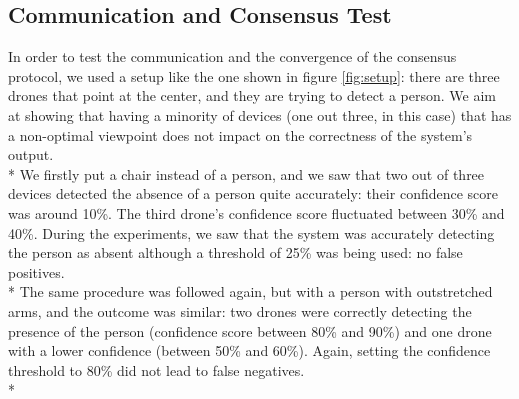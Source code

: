 \documentclass[10pt,conference,compsocconf]{IEEEtran}
\begin{document}
\subsection{Communication and Consensus Test}
In order to test the communication and the convergence of the consensus protocol, we used a setup like the one shown in figure \ref{fig:setup}: there are three drones that point at the center, and they are trying to detect a person. We aim at showing that having a minority of devices (one out three, in this case) that has a non-optimal viewpoint does not impact on the correctness of the system's output.\\*
We firstly put a chair instead of a person, and we saw that two out of three devices detected the absence of a person quite accurately: their confidence score was around 10\%. The third drone's confidence score fluctuated between 30\% and 40\%. During the experiments, we saw that the system was accurately detecting the person as absent although a threshold of 25\% was being used: no false positives.\\*
The same procedure was followed again, but with a person with outstretched arms, and the outcome was similar: two drones were correctly detecting the presence of the person (confidence score between 80\% and 90\%) and one drone with a lower confidence (between 50\% and 60\%). Again, setting the confidence threshold to 80\% did not lead to false negatives.\\*
\end{document}
